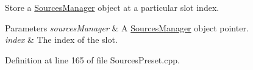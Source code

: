 Store a \hyperlink{class_hoa2_d_1_1_sources_manager}{Sources\-Manager} object at a particular slot index. 


\begin{DoxyParams}{Parameters}
{\em sources\-Manager} & A \hyperlink{class_hoa2_d_1_1_sources_manager}{Sources\-Manager} object pointer. \\
\hline
{\em index} & The index of the slot. \\
\hline
\end{DoxyParams}


Definition at line 165 of file Sources\-Preset.\-cpp.

